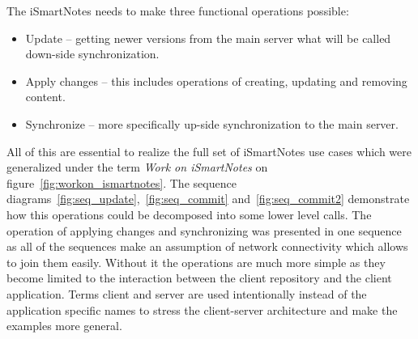 The iSmartNotes needs to make three functional operations possible: 
\begin{itemize}
\item{Update -- getting newer versions from the main server what will be called down-side synchronization.}
\item{Apply changes -- this includes operations of creating, updating and removing content.}
\item{Synchronize -- more specifically up-side synchronization to the main server.}
\end{itemize}
All of this are essential to realize the full set of iSmartNotes use cases which were generalized under the term \textit{Work on iSmartNotes} on figure~\ref{fig:workon_ismartnotes}. The sequence diagrams~\ref{fig:seq_update},~\ref{fig:seq_commit} and~\ref{fig:seq_commit2}  demonstrate how this operations could be decomposed into some lower level calls. The operation of applying changes and synchronizing was presented in one sequence as all of the sequences make an assumption of network connectivity which allows to join them easily. Without it the operations are much more simple as they become limited to the interaction between the client repository and the client application. Terms client and server are used intentionally instead of the application specific names to stress the client-server architecture and make the examples more general.

